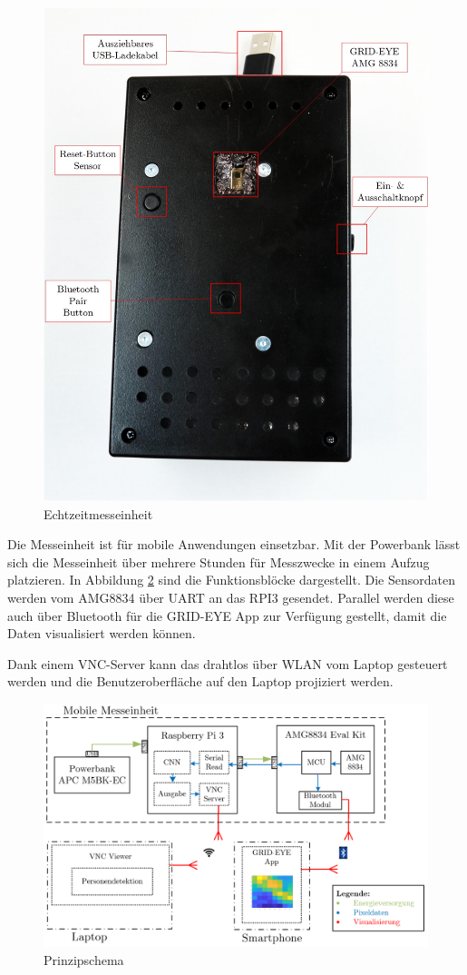 \begin{figure}[H]
	\centering
	\includegraphics[width=0.8\linewidth]{fig/Echtzeitmessgeraet.jpg}
	\caption{Echtzeitmesseinheit}
	\label{fig:einheit1}
\end{figure}

Die Messeinheit ist für mobile Anwendungen einsetzbar. Mit der Powerbank lässt sich die Messeinheit über mehrere Stunden für Messzwecke in einem Aufzug platzieren. In Abbildung \ref{fig:einheit2}  sind die Funktionsblöcke dargestellt. Die Sensordaten werden vom AMG8834 über \ac{UART} an das \ac{RPI3} gesendet. Parallel werden diese auch über Bluetooth für die GRID-EYE App zur Verfügung gestellt, damit die Daten visualisiert werden können.

Dank einem VNC-Server kann das  drahtlos über WLAN vom Laptop gesteuert werden und die Benutzeroberfläche auf den Laptop projiziert werden. 

\begin{figure}[H]
	\centering
	\includegraphics[width=0.8\linewidth]{fig/Messeinheit.png}
	\caption{Prinzipschema}
	\label{fig:einheit2}
\end{figure}

